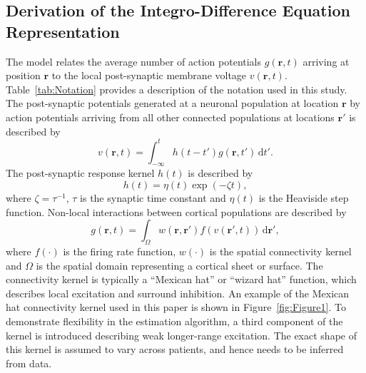 \documentclass[12pt]{iopart}
\begin{document}
\subsection{Derivation of the Integro-Difference Equation Representation}
The model relates the average number of action potentials $g(\mathbf{r},t)$ arriving at position $\mathbf{r}$ to the local post-synaptic membrane voltage $v(\mathbf{r},t)$. Table~\ref{tab:Notation} provides a description of the notation used in this study. The post-synaptic potentials generated at a neuronal population at location $\mathbf{r}$ by action potentials arriving from all other connected populations at locations $\mathbf{r}'$ is described by 
\begin{equation}
	\label{SpikesToPotential} v\left( {\mathbf{r},t} \right) = \int_{ - \infty }^t {h\left( {t - t'} \right)g\left( {\mathbf{r},t'} \right) \, \mathrm{d}t'}. 
\end{equation}
The post-synaptic response kernel $h(t)$ is described by 
\begin{equation}
	\label{SynapticRespKernel} h(t) = \eta(t)\exp{\left(-\zeta t\right)}, 
\end{equation}
where $\zeta=\tau^{-1}$, $\tau$ is the synaptic time constant and $\eta(t)$ is the Heaviside step function. Non-local interactions between cortical populations are described by 
\begin{equation}
	\label{RateBasedInteractions} g\left( \mathbf{r},t \right) = \int_\Omega {w\left( \mathbf{r},\mathbf{r}' \right)f\left( v\left( \mathbf{r}',t \right) \right)\, \mathrm{d}\mathbf{r}'}, 
\end{equation}
where $f(\cdot)$ is the firing rate function, $w(\cdot)$ is the spatial connectivity kernel and $\Omega$ is the spatial domain representing a cortical sheet or surface. The connectivity kernel is typically a ``Mexican hat'' or ``wizard hat'' function, which describes local excitation and surround inhibition. An example of the Mexican hat connectivity kernel used in this paper is shown in Figure~\ref{fig:Figure1}. To demonstrate flexibility in the estimation algorithm, a third component of the kernel is introduced describing weak longer-range excitation. The exact shape of this kernel is assumed to vary across patients, and hence needs to be inferred from data.
\end{document}
